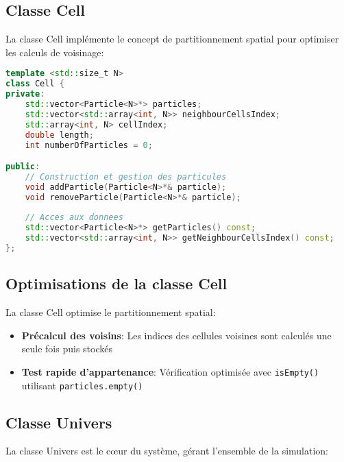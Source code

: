 \documentclass[12pt,a4paper]{article}
\begin{document}
\subsection{Classe Cell}

La classe Cell implémente le concept de partitionnement spatial pour optimiser les calculs de voisinage:

\begin{lstlisting}[language=C++, caption=Extrait de la classe Cell]
template <std::size_t N>
class Cell {
private:
    std::vector<Particle<N>*> particles;
    std::vector<std::array<int, N>> neighbourCellsIndex;
    std::array<int, N> cellIndex;
    double length;
    int numberOfParticles = 0;

public:
    // Construction et gestion des particules
    void addParticle(Particle<N>*& particle);
    void removeParticle(Particle<N>*& particle);
    
    // Acces aux donnees
    std::vector<Particle<N>*> getParticles() const;
    std::vector<std::array<int, N>> getNeighbourCellsIndex() const;
};
\end{lstlisting}

\subsection{Optimisations de la classe Cell}

La classe Cell optimise le partitionnement spatial:

\begin{itemize}
    \item \textbf{Précalcul des voisins}: Les indices des cellules voisines sont calculés une seule fois puis stockés
    \item \textbf{Test rapide d'appartenance}: Vérification optimisée avec \texttt{isEmpty()} utilisant \texttt{particles.empty()}
\end{itemize}

\subsection{Classe Univers}

La classe Univers est le cœur du système, gérant l'ensemble de la simulation:
\end{document}
